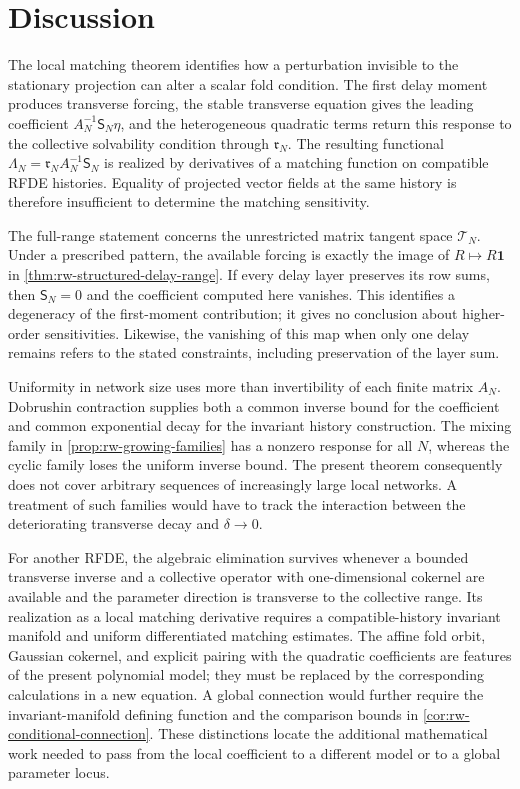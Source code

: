 \section{Discussion}
\label{sec:scope-transfer}

The local matching theorem identifies how a perturbation invisible to the
stationary projection can alter a scalar fold condition.  The first delay
moment produces transverse forcing, the stable transverse equation gives
the leading coefficient \(A_N^{-1}\mathsf S_N\eta\), and the heterogeneous quadratic
terms return this response to the collective solvability condition through
\(\mathfrak r_N\).  The resulting functional
\(\Lambda_N=\mathfrak r_NA_N^{-1}\mathsf S_N\) is realized by derivatives
of a matching function on compatible RFDE histories.  Equality of projected
vector fields at the same history is therefore insufficient to determine
the matching sensitivity.

The full-range statement concerns the unrestricted matrix tangent space
\(\mathcal T_N\).  Under a prescribed pattern, the available forcing is
exactly the image of \(R\mapsto R\mathbf1\) in
\cref{thm:rw-structured-delay-range}.  If every delay layer preserves its
row sums, then \(\mathsf S_N=0\) and the coefficient computed here
vanishes.  This identifies a degeneracy of the first-moment contribution;
it gives no conclusion about higher-order sensitivities.  Likewise, the
vanishing of this map when only one delay remains refers to the stated
constraints, including preservation of the layer sum.

Uniformity in network size uses more than invertibility of each finite
matrix \(A_N\).  Dobrushin contraction supplies both a common inverse
bound for the coefficient and common exponential decay for the invariant
history construction.  The mixing family in
\cref{prop:rw-growing-families} has a nonzero response for all \(N\),
whereas the cyclic family loses the uniform inverse bound.  The present
theorem consequently does not cover arbitrary sequences of increasingly
large local networks.  A treatment of such families would have to track
the interaction between the deteriorating transverse decay and
\(\delta\to0\).

For another RFDE, the algebraic elimination survives whenever a bounded
transverse inverse and a collective operator with one-dimensional cokernel
are available and the parameter direction is transverse to the collective
range.  Its realization as a local matching derivative requires a
compatible-history invariant manifold and uniform differentiated matching
estimates.  The affine fold orbit, Gaussian cokernel, and explicit pairing
with the quadratic coefficients are features of the present polynomial
model; they must be replaced by the corresponding calculations in a new
equation.  A global connection would further require the invariant-manifold
defining function and the comparison bounds in
\cref{cor:rw-conditional-connection}.  These distinctions locate the
additional mathematical work needed to pass from the local coefficient to
a different model or to a global parameter locus.
